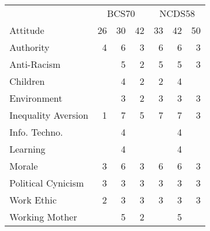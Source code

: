 \begin{tabular}{lrrrrrr}
\toprule
\multicolumn{1}{c}{} & \multicolumn{3}{c}{BCS70} & \multicolumn{3}{c}{NCDS58} \\
\cmidrule(l{3pt}r{3pt}){2-4} \cmidrule(l{3pt}r{3pt}){5-7}
Attitude & 26 & 30 & 42 & 33 & 42 & 50\\
\midrule
Authority & 4 & 6 & 3 & 6 & 6 & 3\\
Anti-Racism &  & 5 & 2 & 5 & 5 & 3\\
Children &  & 4 & 2 & 2 & 4 & \\
Environment &  & 3 & 2 & 3 & 3 & 3\\
Inequality Aversion & 1 & 7 & 5 & 7 & 7 & 3\\
Info. Techno. &  & 4 &  &  & 4 & \\
Learning &  & 4 &  &  & 4 & \\
Morale & 3 & 6 & 3 & 6 & 6 & 3\\
Political Cynicism & 3 & 3 & 3 & 3 & 3 & 3\\
Work Ethic & 2 & 3 & 3 & 3 & 3 & 3\\
Working Mother &  & 5 & 2 &  & 5 & \\
\bottomrule
\end{tabular}